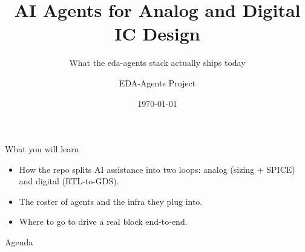 \documentclass[aspectratio=169,11pt]{beamer}
\title{AI Agents for Analog and Digital IC Design}
\subtitle{What the eda-agents stack actually ships today}
\author{EDA-Agents Project}
\institute{Open-Source IC Design}
\date{\today}
\begin{document}
\begin{frame}[plain]
  \titlepage
\end{frame}

\begin{frame}{What you will learn}
  \begin{itemize}
    \item How the  repo splits AI assistance into two
          loops: analog (sizing + SPICE) and digital (RTL-to-GDS).
    \item The roster of agents and the infra they plug into.
    \item Where to go to drive a real block end-to-end.
  \end{itemize}
\end{frame}

\begin{frame}{Agenda}
  \tableofcontents
\end{frame}







\end{document}
